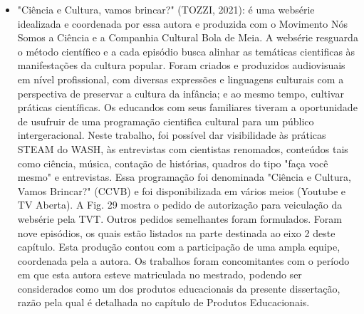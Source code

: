 \begin{itemize}
\item "Ciência e Cultura, vamos brincar?"  (TOZZI, 2021): é uma websérie idealizada  e coordenada por essa  autora e produzida com o Movimento Nós Somos a Ciência e a Companhia Cultural Bola de Meia. A websérie resguarda o método científico e a cada episódio  busca  alinhar as temáticas cientificas às manifestações  da cultura popular.  Foram criados e produzidos audiovisuais em nível profissional, com diversas expressões e linguagens culturais  com a perspectiva de preservar a cultura da infância; e ao mesmo tempo,  cultivar práticas científicas.  Os educandos com seus familiares tiveram a oportunidade de usufruir de uma programação cientifica cultural para um público intergeracional. Neste trabalho, foi possível dar visibilidade às práticas STEAM do WASH,  às entrevistas com cientistas renomados, conteúdos tais como ciência, música, contação de histórias, quadros do tipo "faça você mesmo" e entrevistas. Essa programação foi denominada "Ciência e Cultura, Vamos Brincar?" (CCVB) e foi disponibilizada em vários meios (Youtube e TV Aberta). A Fig. 29 mostra o pedido de autorização para veiculação da websérie pela TVT. Outros pedidos semelhantes foram formulados. Foram nove episódios, os quais estão listados na parte destinada ao eixo 2 deste capítulo. Esta produção contou com a participação de uma ampla equipe, coordenada pela a autora. Os trabalhos foram concomitantes com o período em que esta autora esteve matriculada no mestrado, podendo ser considerados como um dos produtos educacionais da presente dissertação, razão pela qual é detalhada no capítulo de Produtos Educacionais.
\end{itemize}



